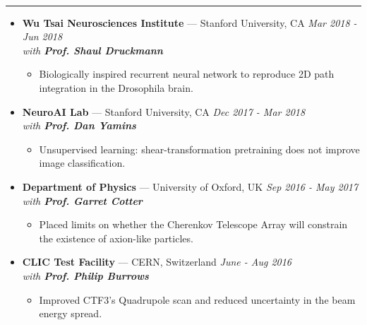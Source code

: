 \documentclass[11pt, oneside]{article}
\newenvironment{ressection}[1]{
	\vspace{4pt}
	{\selectfont\Large\color{Mycolor2}{\textbf{#1}}}
	\vspace{-6.5pt} \\
	\textcolor{Mycolor2}{\rule{\textwidth}{0.7pt}}
	\begin{itemize}
	\vspace{3pt}
}{
	\end{itemize}
}
\newcommand{\ressubitem}{
	\vspace{-4pt}
	\item
}
\newcommand{\resbigitem}[3]{
	\vspace{-5pt}
	\item[]
	\textbf{#1} --- #2 %
	\hfill
	\textit{#3}
}
\newenvironment{ressubsec}[3]{
	\resbigitem{#1}{#2}{#3}
	\vspace{-2pt}
	\begin{itemize}
}{
	\end{itemize}
}
\begin{document}
\begin{ressection}{\textbf{Experience}}
\vspace{2pt}
\begin{ressubsec}{Wu Tsai Neurosciences Institute}{Stanford University, CA}{Mar 2018 - Jun 2018 \\ with \textbf{Prof. Shaul Druckmann}}
\ressubitem{Biologically inspired recurrent neural network to reproduce 2D path integration in the Drosophila brain.}
	\end{ressubsec}
\newpage

\vspace{2pt}
\begin{ressubsec}{NeuroAI Lab}{Stanford University, CA}{Dec 2017 - Mar 2018 \\ with \textbf{Prof. Dan Yamins}}
	\ressubitem{Unsupervised learning: shear-transformation pretraining does not improve image classification.}
	\end{ressubsec}

\vspace{2pt}
\begin{ressubsec}{Department of Physics}{University of Oxford, UK}{Sep 2016 - May 2017 \\ with \textbf{Prof. Garret Cotter}}
		\ressubitem{Placed limits on whether the Cherenkov Telescope Array will constrain the existence of axion-like particles.}
	\end{ressubsec}

\vspace{2pt}
\begin{ressubsec}{CLIC Test Facility}{CERN, Switzerland}{June - Aug 2016 \\ with \textbf{Prof. Philip Burrows}}
\ressubitem{Improved CTF3's Quadrupole scan and reduced uncertainty in the beam energy spread.}
	\end{ressubsec}


\end{ressection}
\end{document}
